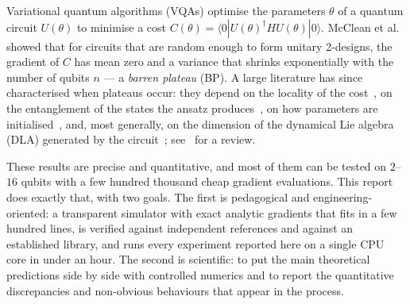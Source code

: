 \documentclass[11pt]{article}
\begin{document}
Variational quantum algorithms (VQAs) optimise the parameters $\theta$ of a quantum circuit $U(\theta)$ to minimise a cost $C(\theta)=\langle 0|U(\theta)^\dagger H U(\theta)|0\rangle$. McClean et al.~\cite{mcclean2018} showed that for circuits that are random enough to form unitary 2-designs, the gradient of $C$ has mean zero and a variance that shrinks exponentially with the number of qubits $n$ --- a \emph{barren plateau} (BP). A large literature has since characterised when plateaus occur: they depend on the locality of the cost~\cite{cerezo2021}, on the entanglement of the states the ansatz produces~\cite{ortiz2021}, on how parameters are initialised~\cite{grant2019,zhang2022}, and, most generally, on the dimension of the dynamical Lie algebra (DLA) generated by the circuit~\cite{larocca2022,ragone2024,fontana2024}; see~\cite{larocca2025} for a review.

These results are precise and quantitative, and most of them can be tested on $2$--$16$ qubits with a few hundred thousand cheap gradient evaluations. This report does exactly that, with two goals. The first is pedagogical and engineering-oriented: a transparent simulator with exact analytic gradients that fits in a few hundred lines, is verified against independent references and against an established library, and runs every experiment reported here on a single CPU core in under an hour. The second is scientific: to put the main theoretical predictions side by side with controlled numerics and to report the quantitative discrepancies and non-obvious behaviours that appear in the process.
\end{document}
